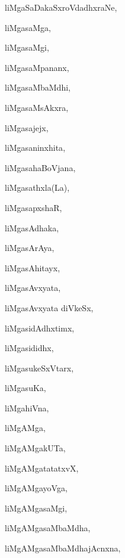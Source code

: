\begin{multicols}{3}
{\noindent
{liMgaSaDakaSxroVdadhxraNe}, \pageref{liMgaSaDakaSxroVdadhxraNe}

\noindent
{liMgasaMga}, \pageref{liMgasaMga}

\noindent
{liMgasaMgi}, \pageref{liMgasaMgi}

\noindent
{liMgasaMpananx}, \pageref{liMgasaMpananx}

\noindent
{liMgasaMbaMdhi}, \pageref{liMgasaMbaMdhi}

\noindent
{liMgasaMsAkxra}, \pageref{liMgasaMsAkxra}

\noindent
{liMgasajejx}, \pageref{liMgasajejx}

\noindent
{liMgasaninxhita}, \pageref{liMgasaninxhita}

\noindent
{liMgasahaBoVjana}, \pageref{liMgasahaBoVjana}

\noindent
{liMgasathxla(La)}, \pageref{liMgasathxla(La)}

\noindent
{liMgasapxshaR}, \pageref{liMgasapxshaR}

\noindent
{liMgasAdhaka}, \pageref{liMgasAdhaka}

\noindent
{liMgasArAya}, \pageref{liMgasArAya}

\noindent
{liMgasAhitayx}, \pageref{liMgasAhitayx}

\noindent
{liMgasAvxyata}, \pageref{liMgasAvxyata}

\noindent
{liMgasAvxyata diVkeSx}, \pageref{liMgasAvxyatadiVkeSx}

\noindent
{liMgasidAdhxtimx}, \pageref{liMgasidAdhxtimx}

\noindent
{liMgasididhx}, \pageref{liMgasididhx}

\noindent
{liMgasukeSxVtarx}, \pageref{liMgasukeSxVtarx}

\noindent
{liMgasuKa}, \pageref{liMgasuKa}

\noindent
{liMgahiVna}, \pageref{liMgahiVna}

\noindent
{liMgAMga}, \pageref{liMgAMga}

\noindent
{liMgAMgakUTa}, \pageref{liMgAMgakUTa}

\noindent
{liMgAMgatatatxvX}, \pageref{liMgAMgatatatxvX}

\noindent
{liMgAMgayoVga}, \pageref{liMgAMgayoVga}

\noindent
{liMgAMgasaMgi}, \pageref{liMgAMgasaMgi}

\noindent
{liMgAMgasaMbaMdha}, \pageref{liMgAMgasaMbaMdha}

\noindent
{liMgAMgasaMbaMdhajAcnxna}, \pageref{liMgAMgasaMbaMdhajAcnxna}

}
\end{multicols}
